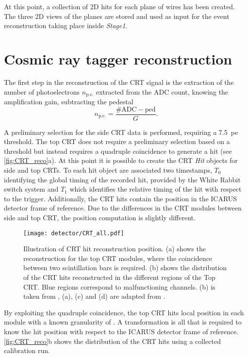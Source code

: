 At this point, a collection of 2D hits for each plane of wires has been created. The three 2D views of the planes are stored and used as input for the event reconstruction taking place inside \emph{Stage1}. 

\section{Cosmic ray tagger reconstruction} The first step in the reconstruction of the CRT signal is the extraction of the number of photoelectrons $n_\mathrm{p.e.}$ extracted from the ADC count, knowing the amplification gain, subtracting the pedestal \begin{equation}
    n_\mathrm{p.e.} = \frac{\mathrm{\#ADC} - \mathrm{ped}}{G}. 
\end{equation} 

A preliminary selection for the side CRT data is performed, requiring a \SI{7.5}{pe} threshold. The top CRT does not require a preliminary selection based on a threshold but instead requires a quadruple coincidence to generate a hit (see \autoref{fig:CRT_reco}a). At this point it is possible to create the CRT \emph{Hit} objects for side and top CRTs. To each hit object are associated two timestamps,  $T_0$ identifying the global timing of the recorded hit, provided by the White Rabbit switch system and $T_1$ which identifies the relative timing of the hit with respect to the trigger. Additionally, the CRT hits contain the position in the ICARUS detector frame of reference. Due to the differences in the CRT modules between side and top CRT, the position computation is slightly different. 

\begin{figure}
    \centering
    \texttt{[image: detector/CRT\_all.pdf]}
    \caption[CRT Hit reconstruction in space]{Illustration of CRT hit reconstruction position. (a) shows the reconstruction for the top CRT modules, where the coincidence between two scintillation bars is required. (b) shows the distribution of the CRT hits reconstructed in the different regions of the Top CRT. Blue regions
correspond to malfunctioning channels. (b) is taken from \cite{Poppi:2023zmp}, (a), (c) and (d) are adapted from \cite{arteroponsStudyReconstructionNuMuCC}.}
    \label{fig:CRT_reco}
\end{figure}

By exploiting the quadruple coincidence, the top CRT hits local position in each module with a known granularity of . A transformation is all that is required to know the hit position with respect to the ICARUS detector frame of reference. \autoref{fig:CRT_reco}b shows the distribution of the CRT hits using a collected calibration run. 

